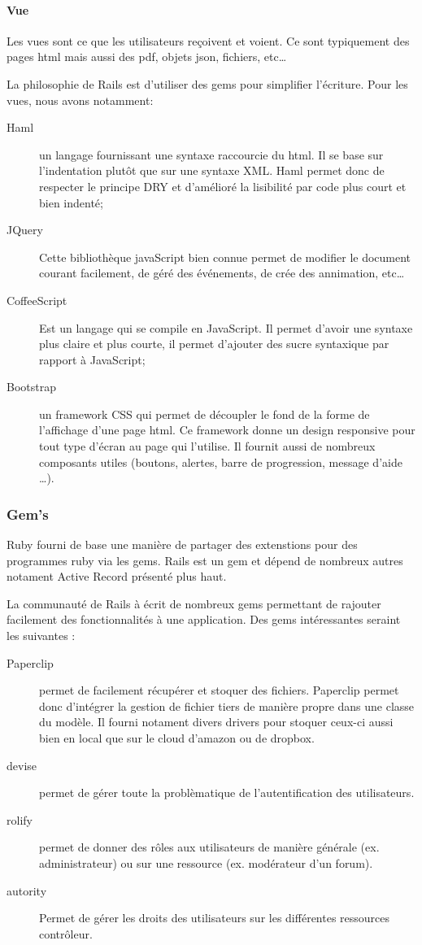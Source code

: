 \paragraph{Vue} 
Les vues sont ce que les utilisateurs reçoivent et voient. Ce sont typiquement des pages html mais aussi des pdf, objets json, fichiers, etc\ldots 

La philosophie de Rails est d'utiliser des gems pour simplifier l'écriture. Pour les vues, nous avons notamment:
\begin{description}
  \item[Haml] un langage fournissant une syntaxe raccourcie du html. Il se base sur l'indentation plutôt que sur une syntaxe XML. Haml permet donc de respecter le principe DRY et d'amélioré la lisibilité par code plus court et bien indenté;
  \item[JQuery] Cette bibliothèque javaScript bien connue permet de modifier le document courant facilement, de géré des événements, de crée des annimation, etc\ldots
  \item[CoffeeScript] Est un langage qui se compile en JavaScript. Il permet d'avoir une syntaxe plus claire et plus courte, il permet d'ajouter des sucre syntaxique par rapport à JavaScript;
  \item[Bootstrap] un framework CSS qui permet de découpler le fond de la forme de l'affichage d'une page html. Ce framework donne un design responsive pour tout type d'écran au page qui l'utilise. Il fournit aussi de nombreux composants utiles (boutons, alertes, barre de progression, message d'aide \ldots).
\end{description}

\subsubsection{Gem's}
Ruby fourni de base une manière de partager des extenstions pour des programmes ruby via les gems. Rails est un gem et dépend de nombreux autres notament Active Record présenté plus haut.

La communauté de Rails à écrit de nombreux gems permettant de rajouter facilement des fonctionnalités à une application. Des gems intéressantes seraint les suivantes :
\begin{description}
  \item[Paperclip] permet de facilement récupérer et stoquer des fichiers. Paperclip permet donc d'intégrer la gestion de fichier tiers de manière propre dans une classe du modèle. Il fourni notament divers drivers pour stoquer ceux-ci aussi bien en local que sur le cloud d'amazon ou de dropbox.
  \item[devise] permet de gérer toute la problèmatique de l'autentification des utilisateurs.
  \item[rolify] permet de donner des rôles aux utilisateurs de manière générale (ex. administrateur) ou sur une ressource (ex. modérateur d'un forum).
  \item[autority] Permet de gérer les droits des utilisateurs sur les différentes ressources contrôleur.
\end{description}

